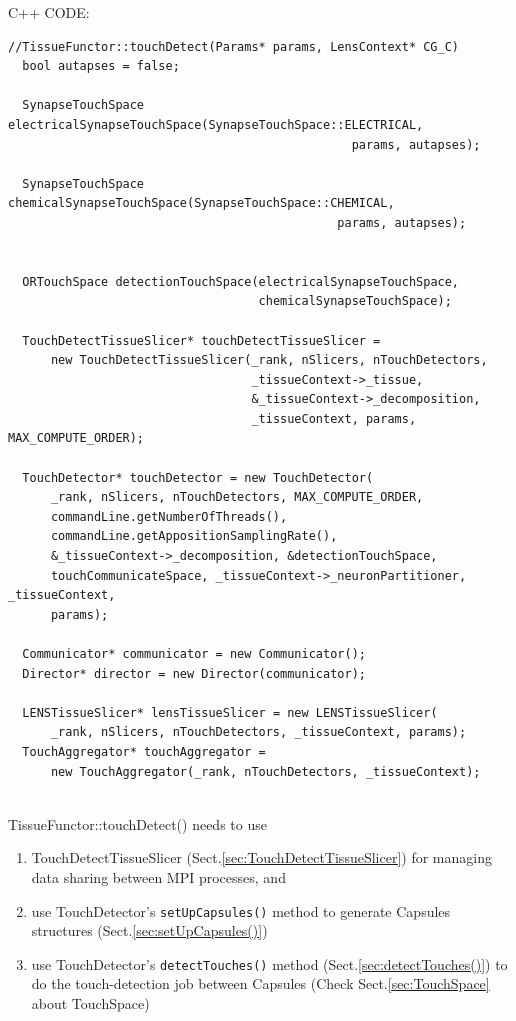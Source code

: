 C++ CODE:
\begin{lstlisting}
//TissueFunctor::touchDetect(Params* params, LensContext* CG_C)
  bool autapses = false;

  SynapseTouchSpace electricalSynapseTouchSpace(SynapseTouchSpace::ELECTRICAL,
                                                params, autapses);

  SynapseTouchSpace chemicalSynapseTouchSpace(SynapseTouchSpace::CHEMICAL,
                                              params, autapses);


  ORTouchSpace detectionTouchSpace(electricalSynapseTouchSpace,
                                   chemicalSynapseTouchSpace);

  TouchDetectTissueSlicer* touchDetectTissueSlicer =
      new TouchDetectTissueSlicer(_rank, nSlicers, nTouchDetectors,
                                  _tissueContext->_tissue,
                                  &_tissueContext->_decomposition,
                                  _tissueContext, params, MAX_COMPUTE_ORDER);

  TouchDetector* touchDetector = new TouchDetector(
      _rank, nSlicers, nTouchDetectors, MAX_COMPUTE_ORDER,
      commandLine.getNumberOfThreads(), 
      commandLine.getAppositionSamplingRate(),
      &_tissueContext->_decomposition, &detectionTouchSpace,
      touchCommunicateSpace, _tissueContext->_neuronPartitioner, _tissueContext,
      params);

  Communicator* communicator = new Communicator();
  Director* director = new Director(communicator);

  LENSTissueSlicer* lensTissueSlicer = new LENSTissueSlicer(
      _rank, nSlicers, nTouchDetectors, _tissueContext, params);
  TouchAggregator* touchAggregator =
      new TouchAggregator(_rank, nTouchDetectors, _tissueContext);
  
\end{lstlisting}

TissueFunctor::touchDetect() needs to use 
\begin{enumerate}
  \item  TouchDetectTissueSlicer
(Sect.\ref{sec:TouchDetectTissueSlicer}) for managing data sharing between MPI
processes, and 
  
  \item use TouchDetector's \verb!setUpCapsules()! method to generate Capsules
  structures (Sect.\ref{sec:setUpCapsules()})
  
  
  \item use TouchDetector's \verb!detectTouches()! method
  (Sect.\ref{sec:detectTouches()}) to do the touch-detection job between
  Capsules (Check Sect.\ref{sec:TouchSpace} about TouchSpace)

\end{enumerate}

